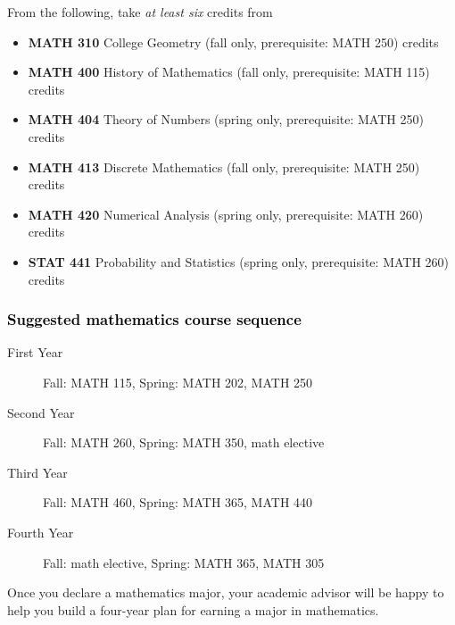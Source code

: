 \documentclass[10pt]{article}
\newcommand{\discrete}{\textbf{MATH 413} Discrete Mathematics  (fall only, prerequisite: MATH 250)\dotfill 3 credits}
\newcommand{\statistics}{\textbf{STAT 441} Probability and Statistics (spring only, prerequisite: MATH 260)  \dotfill  3 credits}
\newcommand{\numerical}{\textbf{MATH 420}   Numerical Analysis   (spring only, prerequisite: MATH 260)\dotfill 3 credits}
\newcommand{\collegegeometry}{\textbf{MATH 310}	College Geometry (fall only,  prerequisite: MATH 250) \dotfill 3 credits}
\newcommand{\mathhistory}{\textbf{MATH 400} History of Mathematics (fall only,  prerequisite: MATH 115) \dotfill 3 credits}
\newcommand{\numbertheory}{\textbf{MATH 404} Theory of Numbers (spring only,  prerequisite: MATH 250) \dotfill 3 credits}
\begin{document}
From the following, take \emph{at least six} credits from
\vspace{0.1in}

\begin{itemize}
\item \collegegeometry
\item \mathhistory
\item \numbertheory
\item \discrete
\item \numerical
\item \statistics
\end{itemize}




\subsubsection*{\textcolor{black}{Suggested mathematics course sequence}}

\begin{description}
   \item[\phantom{xxx} First  Year] Fall: MATH 115, Spring:  MATH 202, MATH 250
      \item[\phantom{xxx} Second Year]  Fall: MATH 260,  Spring: MATH 350, math elective
     \item[\phantom{xxx} Third Year]  Fall: MATH 460, Spring: MATH 365, MATH 440
     \item[\phantom{xxx} Fourth Year]  Fall: math elective, Spring: MATH 365, MATH 305
 \end{description}
  \vspace{0.1in}

 \noindent Once you declare a mathematics major, your academic advisor will be happy to help you build a four-year plan for earning a major in mathematics.

   \vspace{0.1in}
\end{document}
